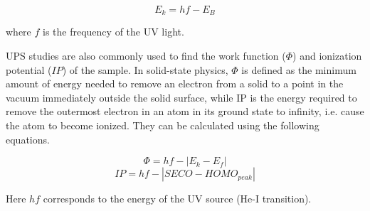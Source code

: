 \documentclass[12pt]{article}
\begin{document}
\begin{equation}
    E_k = hf - E_B
    \label{eqn:energy_conservation}
\end{equation}

\noindent where $f$ is the frequency of the UV light.
\vspace{7pt}

UPS studies are also commonly used to find the work function ($\Phi$) and ionization potential ($IP$) of the sample. In solid-state physics, $\Phi$ is defined as the minimum amount of energy needed to remove an electron from a solid to a point in the vacuum immediately outside the solid surface, while IP is the energy required to remove the outermost electron in an atom in its ground state to infinity, i.e. cause the atom to become ionized. They can be calculated using the following equations.

\begin{equation}
    \Phi = hf - |E_k - E_f|
    \label{eqn:phi}
\end{equation}
\begin{equation}
    IP = hf - |SECO - HOMO_{peak}|
    \label{eqn:IP}
\end{equation}

Here $hf$ corresponds to the energy of the UV source (He-I transition).
\end{document}
